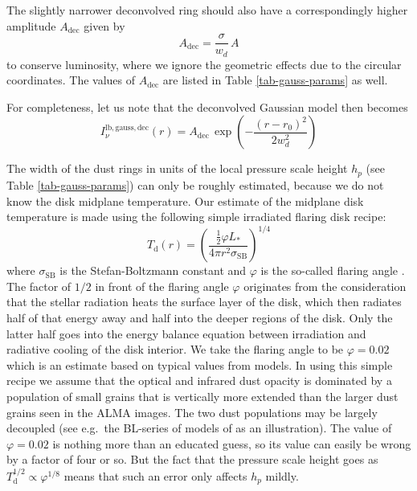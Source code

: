 \documentclass{aa}
\begin{document}
The slightly narrower deconvolved ring should also have a correspondingly
higher amplitude $A_{\mathrm{dec}}$ given by
\begin{equation}\label{eq-a-deconv}
A_{\mathrm{dec}} = \frac{\sigma}{w_d} \, A
\end{equation}
to conserve luminosity, where we ignore the geometric effects due to the
circular coordinates. The values of $A_{\mathrm{dec}}$ are listed in Table
\ref{tab-gauss-params} as well.

For completeness, let us note that the deconvolved Gaussian model then becomes
\begin{equation}\label{eq-gauss-lin-br-temp-deconv}
I_{\nu}^{\mathrm{lb,gauss,dec}}(r) = A_{\mathrm{dec}}\,\exp\left(-\frac{(r-r_0)^2}{2w_d^2}\right)
\end{equation}

The width of the dust rings
in units of the local pressure scale height $h_p$ (see Table
\ref{tab-gauss-params}) can only be roughly estimated, because we do not know
the disk midplane temperature. Our estimate of the midplane disk temperature
is made using the following simple irradiated flaring disk recipe:
\begin{equation}\label{eq-disk-temperature-model}
T_{\mathrm{d}}(r) = \left(\frac{\tfrac{1}{2}\varphi L_{*}}{4\pi r^2\sigma_{\mathrm{SB}}}\right)^{1/4}
\end{equation}
where $\sigma_{\mathrm{SB}}$ is the Stefan-Boltzmann constant and $\varphi$ is
the so-called flaring angle \citep[e.g.][]{1997ApJ...490..368C,
  1998ApJ...500..411D, 2001ApJ...560..957D}. The factor of $1/2$ in front of the
flaring angle $\varphi$ originates from the consideration that the stellar
radiation heats the surface layer of the disk, which then radiates half of that
energy away and half into the deeper regions of the disk. Only the latter half
goes into the energy balance equation between irradiation and radiative cooling
of the disk interior. We take the flaring angle to be $\varphi=0.02$ which is an
estimate based on typical values from models. In using this simple recipe we
assume that the optical and infrared dust opacity is dominated by a population
of small grains that is vertically more extended than the larger dust grains
seen in the ALMA images. The two dust populations may
be largely decoupled (see e.g.\ the BL-series of models of
\citet{2004A&A...417..159D} as an illustration). The value of $\varphi=0.02$ is
nothing more than an educated guess, so its value can easily be wrong by a
factor of four or so. But the fact that the pressure scale height goes as
$T_{\mathrm{d}}^{1/2}\propto \varphi^{1/8}$ means that such an error only
affects $h_p$ mildly.
\end{document}
